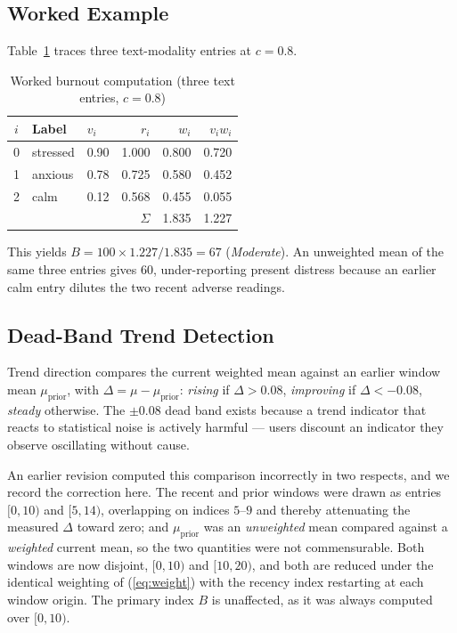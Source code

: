 \documentclass[runningheads]{llncs}
\begin{document}
\subsection{Worked Example}
Table~\ref{tab:worked} traces three text-modality entries at $c = 0.8$.

\begin{table}[htbp]
\caption{Worked burnout computation (three text entries, $c=0.8$)}
\label{tab:worked}
\centering
\begin{tabular}{@{}cllrrr@{}}
\toprule
$i$ & Label & $v_i$ & $r_i$ & $w_i$ & $v_i w_i$ \\
\midrule
0 & stressed & 0.90 & 1.000 & 0.800 & 0.720 \\
1 & anxious  & 0.78 & 0.725 & 0.580 & 0.452 \\
2 & calm     & 0.12 & 0.568 & 0.455 & 0.055 \\
\midrule
\multicolumn{4}{r}{$\Sigma$} & 1.835 & 1.227 \\
\bottomrule
\end{tabular}
\end{table}

This yields $B = 100 \times 1.227 / 1.835 = 67$ (\textit{Moderate}). An
unweighted mean of the same three entries gives $60$, under-reporting present
distress because an earlier calm entry dilutes the two recent adverse
readings.

\subsection{Dead-Band Trend Detection}
Trend direction compares the current weighted mean against an earlier window
mean $\mu_{\text{prior}}$, with $\Delta = \mu - \mu_{\text{prior}}$:
\textit{rising} if $\Delta > 0.08$, \textit{improving} if $\Delta < -0.08$,
\textit{steady} otherwise. The $\pm 0.08$ dead band exists because a trend
indicator that reacts to statistical noise is actively harmful --- users
discount an indicator they observe oscillating without cause.

An earlier revision computed this comparison incorrectly in two respects, and
we record the correction here. The recent and prior windows were drawn as
entries $[0,10)$ and $[5,14)$, overlapping on indices $5$--$9$ and thereby
attenuating the measured $\Delta$ toward zero; and $\mu_{\text{prior}}$ was an
\emph{unweighted} mean compared against a \emph{weighted} current mean, so the
two quantities were not commensurable. Both windows are now disjoint,
$[0,10)$ and $[10,20)$, and both are reduced under the identical weighting of
(\ref{eq:weight}) with the recency index restarting at each window origin. The
primary index $B$ is unaffected, as it was always computed over $[0,10)$.
\end{document}
